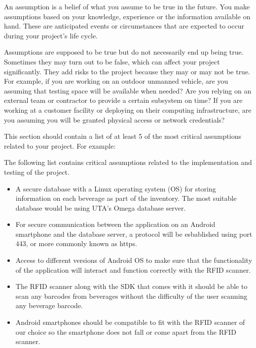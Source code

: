 An assumption is a belief of what you assume to be true in the future. You make assumptions based on your knowledge, experience or the information available on hand. These are anticipated events or circumstances that are expected to occur during your project's life cycle.

Assumptions are supposed to be true but do not necessarily end up being true. Sometimes they may turn out to be false, which can affect your project significantly. They add risks to the project because they may or may not be true. For example, if you are working on an outdoor unmanned vehicle, are you assuming that testing space will be available when needed? Are you relying on an external team or contractor to provide a certain subsystem on time? If you are working at a customer facility or deploying on their computing infrastructure, are you assuming you will be granted physical access or network credentials?

This section should contain a list of at least 5 of the most critical assumptions related to your project. For example:

The following list contains critical assumptions related to the implementation and testing of the project.

\begin{itemize}
  \item A secure database with a Linux operating system (OS) for storing information on each beverage as part of the inventory.  The most         suitable database would be using UTA's Omega database server.
  \item For secure communication between the application on an Android smartphone and the database server, a protocol will be esbablished         using port 443, or more commonly known as https.
  \item Access to different versions of Android OS to make sure that the functionality of the application will interact and function                correctly with the RFID scanner.
  \item The RFID scanner along with the SDK that comes with it should be able to scan any barcodes from beverages without the difficulty           of the user scanning any beverage barcode.
  \item Android smartphones should be compatible to fit with the RFID scanner of our choice so the smartphone does not fall or come apart         from the RFID scanner.
\end{itemize}
